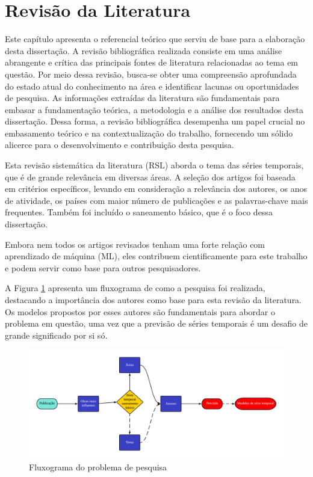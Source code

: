 \section{Revis\~ao da Literatura}\label{sec:refteo}


Este capítulo apresenta o referencial teórico que serviu de base para a elaboração desta dissertação. A revisão bibliográfica realizada consiste em uma análise abrangente e crítica das principais fontes de literatura relacionadas ao tema em questão. Por meio dessa revisão, busca-se obter uma compreensão aprofundada do estado atual do conhecimento na área e identificar lacunas ou oportunidades de pesquisa. As informações extraídas da literatura são fundamentais para embasar a fundamentação teórica, a metodologia e a análise dos resultados desta dissertação. Dessa forma, a revisão bibliográfica desempenha um papel crucial no embasamento teórico e na contextualização do trabalho, fornecendo um sólido alicerce para o desenvolvimento e contribuição desta pesquisa.

Esta revisão sistemática da literatura (RSL) aborda o tema das séries temporais, que é de grande relevância em diversas áreas. A seleção dos artigos foi baseada em critérios específicos, levando em consideração a relevância dos autores, os anos de atividade, os países com maior número de publicações e as palavras-chave mais frequentes. Também foi incluído o saneamento básico, que é o foco dessa dissertação.

Embora nem todos os artigos revisados tenham uma forte relação com aprendizado de máquina (ML), eles contribuem cientificamente para este trabalho e podem servir como base para outros pesquisadores.

A Figura \ref{fig:serie-temporal} apresenta um fluxograma de como a pesquisa foi realizada, destacando a importância dos autores como base para esta revisão da literatura. Os modelos propostos por esses autores são fundamentais para abordar o problema em questão, uma vez que a previsão de séries temporais é um desafio de grande significado por si só.

\begin{figure}[H]
	\centering
	\caption{Fluxograma do problema de pesquisa}
	\label{fig:serie-temporal}
	\includegraphics[width=\linewidth]{Revisao/Figuras/serie_temporal}
	
\end{figure}

